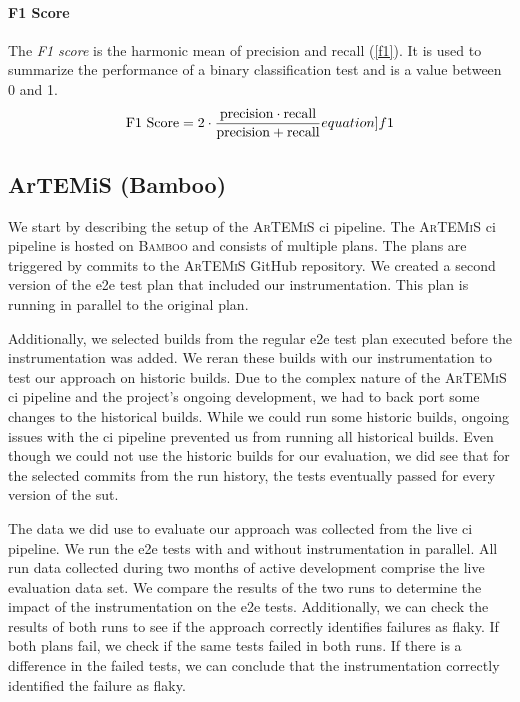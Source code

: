 \paragraph{F1 Score} The \emph{F1 score} is the harmonic mean of precision and recall (\ref{f1}).
It is used to summarize the performance of a binary classification test and is a value between 0 and 1.
\begin{equation}
	\text{F1 Score} = 2 \cdot \frac{\text{precision} \cdot \text{recall}}{\text{precision} + \text{recall}}
	\label[equation]{f1}
\end{equation}

\subsection{ArTEMiS (Bamboo)}
We start by describing the setup of the \textsc{ArTEMiS} \ac{ci} pipeline.
The \textsc{ArTEMiS} \ac{ci} pipeline is hosted on \textsc{Bamboo} \autocite{atlassian_bamboo_nodate} and consists of multiple plans.
The plans are triggered by commits to the \textsc{ArTEMiS} GitHub repository.
We created a second version of the \ac{e2e} test plan that included our instrumentation.
This plan is running in parallel to the original plan.

Additionally, we selected builds from the regular \ac{e2e} test plan executed before the instrumentation was added.
We reran these builds with our instrumentation to test our approach on historic builds.
Due to the complex nature of the \textsc{ArTEMiS} \ac{ci} pipeline and the project's ongoing development, we had to back port some changes to the historical builds.
While we could run some historic builds, ongoing issues with the \ac{ci} pipeline prevented us from running all historical builds.
Even though we could not use the historic builds for our evaluation, we did see that for the selected commits from the run history, the tests eventually passed for every version of the \ac{sut}.

The data we did use to evaluate our approach was collected from the live \ac{ci} pipeline.
We run the \ac{e2e} tests with and without instrumentation in parallel.
All run data collected during two months of active development comprise the live evaluation data set.
We compare the results of the two runs to determine the impact of the instrumentation on the \ac{e2e} tests.
Additionally, we can check the results of both runs to see if the approach correctly identifies failures as flaky.
If both plans fail, we check if the same tests failed in both runs.
If there is a difference in the failed tests, we can conclude that the instrumentation correctly identified the failure as flaky.

